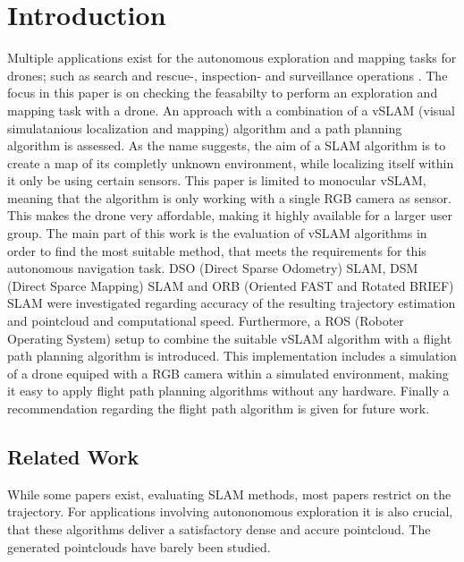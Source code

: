 \chapter{Introduction}

Multiple applications exist for the autonomous exploration and mapping tasks for drones;
 such as search and rescue-, inspection- and surveillance operations \cite{tasks}.
 The focus in this paper is on checking the feasabilty to perform an exploration and mapping task with a drone.
An approach with a combination of a vSLAM (visual simulatanious localization
and mapping) algorithm and a path planning algorithm is assessed. As the name 
suggests, the aim of a SLAM algorithm is to create a map of its completly
 unknown environment, while localizing itself within it only be using certain sensors.
 This paper is limited to monocular vSLAM, meaning that the algorithm is only working
 with a single RGB camera as sensor. This makes the drone very affordable, making it highly available for a larger user group.  
The main part of this work is the evaluation of vSLAM algorithms in order to find the 
most suitable method, that meets the requirements for this autonomous navigation task.
 DSO (Direct Sparse Odometry) SLAM, DSM (Direct Sparce Mapping) SLAM and ORB (Oriented FAST and Rotated BRIEF)
 SLAM were investigated regarding accuracy of the resulting trajectory estimation and pointcloud and computational speed. 
Furthermore, a ROS (Roboter Operating System) setup to combine the suitable vSLAM algorithm with a flight
 path planning algorithm is introduced. This implementation includes a simulation of a drone equiped with a RGB camera within a 
 simulated environment, making it easy to apply flight path planning algorithms without any hardware.
 Finally a recommendation regarding the flight path algorithm is given for future work.
 


\section{Related Work}

While some papers exist, evaluating SLAM methods, most papers restrict on the trajectory. For applications involving 
autononomous exploration it is also crucial, that these algorithms deliver a satisfactory dense and accure pointcloud. 
The generated pointclouds have barely been studied. 

